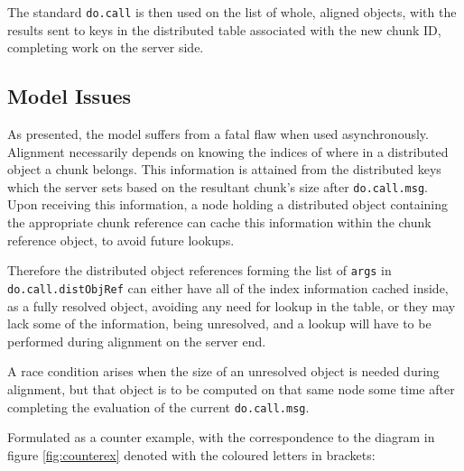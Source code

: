 \documentclass[a4paper,10pt]{article}
\begin{document}
The standard \texttt{do.call} is then used on the list of whole,
aligned objects, with the results sent to keys in the distributed table
associated with the new chunk ID, completing work on the server side.

\subsection{Model Issues}

As presented, the model suffers from a fatal flaw when used asynchronously.
Alignment necessarily depends on knowing the indices of where in a distributed
object a chunk belongs.
This information is attained from the distributed keys which the server sets
based on the resultant chunk's size after \texttt{do.call.msg}.
Upon receiving this information, a node holding a distributed object containing
the appropriate chunk reference can cache this information within the chunk
reference object, to avoid future lookups.

Therefore the distributed object references forming the list of \texttt{args}
in \texttt{do.call.distObjRef} can either have all of the index
information cached inside, as a fully resolved object, avoiding any need for
lookup in the table, or they may lack some of the information, being
unresolved, and a lookup will have to be performed during alignment on the
server end.

A race condition arises when the size of an unresolved object is needed during
alignment, but that object is to be computed on that same node some time after
completing the evaluation of the current \texttt{do.call.msg}. 


Formulated as a counter example, with the correspondence to the diagram in
figure \ref{fig:counterex} denoted with the coloured letters in brackets:
\end{document}
